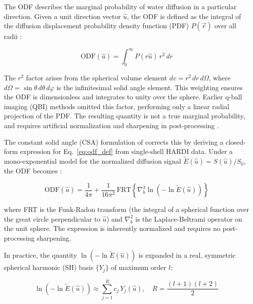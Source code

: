 The ODF describes the marginal probability of water diffusion in a particular direction. Given a unit direction vector $\hat{u}$, the ODF is defined as the integral of the diffusion displacement probability density function (PDF) $P(\vec{r})$ over all radii \cite{aganj2010reconstruction}:

\begin{equation}
	\mathrm{ODF}(\hat{u}) = \int_0^\infty P(r\hat{u})\, r^2\, dr
	\label{eq:odf_def}
\end{equation}

The $r^2$ factor arises from the spherical volume element $dv = r^2\,dr\,d\Omega$, where $d\Omega = \sin\theta\,d\theta\,d\varphi$ is the infinitesimal solid angle element. This weighting ensures the ODF is dimensionless and integrates to unity over the sphere. Earlier q-ball imaging (QBI) methods omitted this factor, performing only a linear radial projection of the PDF. The resulting quantity is not a true marginal probability, and requires artificial normalization and sharpening in post-processing \cite{aganj2010reconstruction}.

The constant solid angle (CSA) formulation of \citeauthor{aganj2010reconstruction} corrects this by deriving a closed-form expression for Eq.~\ref{eq:odf_def} from single-shell HARDI data. Under a mono-exponential model for the normalized diffusion signal $\tilde{E}(\hat{u}) = S(\hat{u})/S_0$, the ODF becomes \cite{aganj2010reconstruction}:

\begin{equation}
	\mathrm{ODF}(\hat{u}) = \frac{1}{4\pi} + \frac{1}{16\pi^2}\,
	\mathrm{FRT}\!\left\{\nabla_b^2 \ln\!\left(-\ln \tilde{E}(\hat{u})\right)\right\}
	\label{eq:csa_odf}
\end{equation}

where FRT is the Funk-Radon transform (the integral of a spherical function over the great circle perpendicular to $\hat{u}$) and $\nabla_b^2$ is the Laplace-Beltrami operator on the unit sphere. The expression is inherently normalized and requires no post-processing sharpening.

In practice, the quantity $\ln(-\ln\tilde{E}(\hat{u}))$ is expanded in a real, symmetric spherical harmonic (SH) basis $\{Y_j\}$ of maximum order $l$:

\begin{equation}
	\ln\!\left(-\ln \tilde{E}(\hat{u})\right) \approx \sum_{j=1}^{R} c_j\, Y_j(\hat{u}),
	\quad R = \frac{(l+1)(l+2)}{2}
	\label{eq:sh_expansion}
\end{equation}


